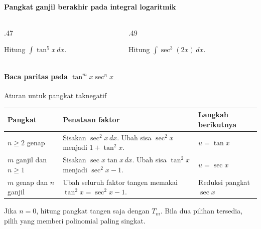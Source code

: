 \documentclass{../../kalkulus-ppt}
\begin{document}
\begin{frame}{\insertsection}
    \framesubtitle{Pangkat ganjil berakhir pada integral logaritmik}
    \begin{columns}[t,onlytextwidth]
        \begin{column}{.47\textwidth}
            \begin{contoh}
                Hitung $\int\tan^5 x\,dx$.
            \end{contoh}
        \end{column}
        \begin{column}{.49\textwidth}
            \begin{contoh}
                Hitung $\int\sec^3(2x)\,dx$.
            \end{contoh}
        \end{column}
    \end{columns}
\end{frame}

\begin{frame}{\insertsection}
    \framesubtitle{Baca paritas pada $\tan^m x\sec^n x$}
    \begin{block}{Aturan untuk pangkat taknegatif}
        \renewcommand{\arraystretch}{1.4}
        \begin{tabularx}{\linewidth}{@{}lXl@{}}
            \textbf{Pangkat} & \textbf{Penataan faktor} & \textbf{Langkah berikutnya}\\ \hline
            $n\ge2$ genap & Sisakan $\sec^2x\,dx$. Ubah sisa $\sec^2x$ menjadi $1+\tan^2x$. &
                $u=\tan x$\\
            $m$ ganjil dan $n\ge1$ & Sisakan $\sec x\tan x\,dx$. Ubah sisa $\tan^2x$ menjadi $\sec^2x-1$. &
                $u=\sec x$\\
            $m$ genap dan $n$ ganjil & Ubah seluruh faktor tangen memakai $\tan^2x=\sec^2x-1$. &
                Reduksi pangkat $\sec x$
        \end{tabularx}
    \end{block}
    Jika $n=0$, hitung pangkat tangen saja dengan $T_m$.
    Bila dua pilihan tersedia, pilih yang memberi polinomial paling singkat.
\end{frame}
\end{document}
